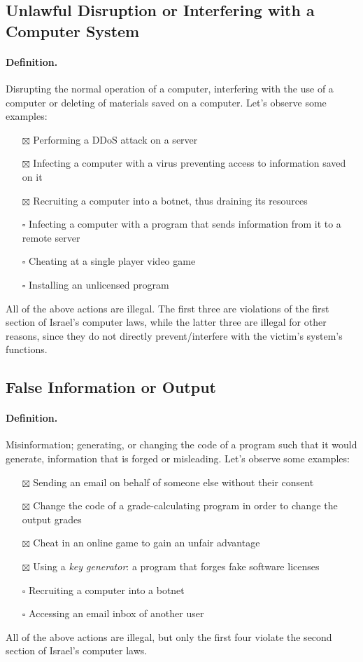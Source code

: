 \subsection{Unlawful Disruption or Interfering with a Computer System}
\paragraph{Definition.} Disrupting the normal operation of a computer, interfering with the use of a computer or deleting of materials saved on a computer.
Let's observe some examples:
\begin{itemize}
    \item[$\boxtimes$] Performing a DDoS attack on a server
    \item[$\boxtimes$] Infecting a computer with a virus preventing access to information saved on it
    \item[$\boxtimes$] Recruiting a computer into a botnet, thus draining its resources
    \item[$\square$] Infecting a computer with a program that sends information from it to a remote server
    \item[$\square$] Cheating at a single player video game
    \item[$\square$] Installing an unlicensed program
\end{itemize}

All of the above actions are illegal. The first three are violations of the first section of Israel's computer laws, while the latter three are illegal for other reasons, since they do not directly prevent/interfere with the victim's system's functions.

\subsection{False Information or Output}
\paragraph{Definition.} Misinformation; generating, or changing the code of a program such that it would generate, information that is forged or misleading.
Let's observe some examples:
\begin{itemize}
    \item[$\boxtimes$] Sending an email on behalf of someone else without their consent
    \item[$\boxtimes$] Change the code of a grade-calculating program in order to change the output grades
    \item[$\boxtimes$] Cheat in an online game to gain an unfair advantage
    \item[$\boxtimes$] Using a \textit{key generator}: a program that forges fake software licenses
    \item[$\square$] Recruiting a computer into a botnet
    \item[$\square$] Accessing an email inbox of another user
\end{itemize}
All of the above actions are illegal, but only the first four violate the second section of Israel's computer laws.


